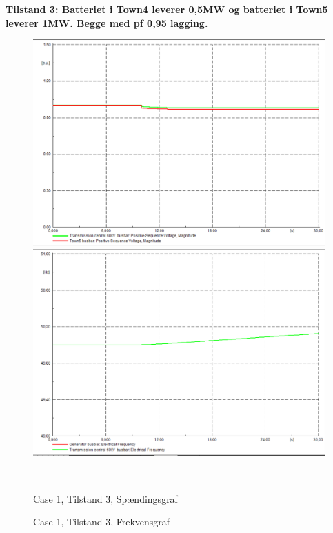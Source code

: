 \textbf{Tilstand 3: Batteriet i Town4 leverer 0,5MW og batteriet i Town5 leverer 1MW. Begge med pf 0,95 lagging.}
\begin{figure}[H]
	\centering
	\begin{minipage}[b]{0.48\textwidth}
		\centering
		\includegraphics[width=1.00\textwidth]{figurer/SmallDisturbance/Voltage3} %
	\end{minipage}
	\hfill
	\begin{minipage}[b]{0.48\textwidth}
		\centering
		\includegraphics[width=1.00\textwidth]{figurer/SmallDisturbance/Freq3} %
	\end{minipage}
	\\ %
	\begin{minipage}[t]{0.48\textwidth}
		\caption{Case 1, Tilstand 3, Spændingsgraf} %
		\label{fig:C1T3V}
	\end{minipage}
	\hfill
	\begin{minipage}[t]{0.48\textwidth}
		\caption{Case 1, Tilstand 3, Frekvensgraf} %
		\label{fig:C1T3F}
	\end{minipage}
\end{figure}


